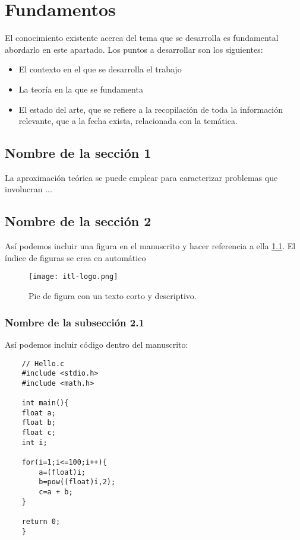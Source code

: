 \chapter{Fundamentos}

El conocimiento existente acerca del tema que se desarrolla es fundamental abordarlo en este apartado. Los puntos a desarrollar son los siguientes: 

\begin{itemize}
	\item[1]El contexto en el que se desarrolla el trabajo
	\item[2]La teoría en la que se fundamenta
	\item[3]El estado del arte, que se refiere a la recopilación de toda la información relevante, que a la fecha exista, relacionada con la temática.
\end{itemize}


\lipsum[2-4]

\lipsum[2-4]

\lipsum[2-4]

\section{Nombre de la sección 1}
La aproximación teórica \cite{Bloomfield1935} se puede emplear para caracterizar problemas que involucran \cite{Traugott1990}...

\section{Nombre de la sección 2}
Así podemos incluir una figura en el manuscrito y hacer referencia a ella \ref{Fig:01}. El índice de figuras se crea en automático

\begin{figure}[htp!]
	\centering
	\texttt{[image: itl-logo.png]}
	\caption{Pie de figura con un texto corto y descriptivo.}
	\label{Fig:01}
\end{figure}

\subsection{Nombre de la subsección 2.1}
Así podemos incluir código dentro del manuscrito:\\
\begin{lstlisting}
	// Hello.c
	#include <stdio.h>
	#include <math.h>
	
	int main(){
	float a;
	float b;
	float c;	
	int i;
	
	for(i=1;i<=100;i++){
		a=(float)i;
		b=pow((float)i,2);		
		c=a + b;
	}

	return 0;
    }
\end{lstlisting}

